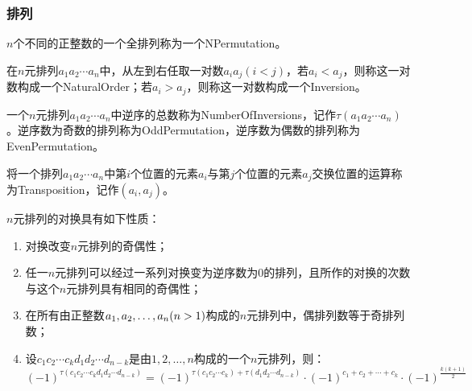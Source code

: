 \subsubsection{排列}
\begin{definition}
	$n$个不同的正整数的一个全排列称为一个\gls{NPermutation}。
\end{definition}
\begin{definition}
	在$n$元排列$a_1a_2\cdots a_n$中，从左到右任取一对数$a_ia_j(i<j)$，若$a_i<a_j$，则称这一对数构成一个\gls{NaturalOrder}；若$a_i>a_j$，则称这一对数构成一个\gls{Inversion}。
\end{definition}
\begin{definition}
	一个$n$元排列$a_1a_2\cdots a_n$中逆序的总数称为\gls{NumberOfInversions}，记作$\tau(a_1a_2\cdots a_n)$。逆序数为奇数的排列称为\gls{OddPermutation}，逆序数为偶数的排列称为\gls{EvenPermutation}。
\end{definition}
\begin{definition}
	将一个排列$a_1a_2\cdots a_n$中第$i$个位置的元素$a_i$与第$j$个位置的元素$a_j$交换位置的运算称为\gls{Transposition}，记作$(a_i,a_j)$。
\end{definition}
\begin{property}\label{prop:Transposition}
	$n$元排列的对换具有如下性质：
	\begin{enumerate}
		\item 对换改变$n$元排列的奇偶性；
		\item 任一$n$元排列可以经过一系列对换变为逆序数为$0$的排列，且所作的对换的次数与这个$n$元排列具有相同的奇偶性；
		\item 在所有由正整数$a_1, a_2, \dots, a_{n}(n>1)$构成的$n$元排列中，偶排列数等于奇排列数；
		\item 设$c_1c_2\cdots c_kd_1d_2\cdots d_{n-k}$是由$1,2,\dots,n$构成的一个$n$元排列，则：
		\begin{equation*}
			(-1)^{\tau(c_1c_2\cdots c_kd_1d_2\cdots d_{n-k})}=(-1)^{\tau(c_1c_2\cdots c_k)+\tau(d_1d_2\cdots d_{n-k})}\cdot(-1)^{c_1+c_2+\cdots+c_k}\cdot(-1)^{\frac{k(k+1)}{2}}
		\end{equation*}
	\end{enumerate}
\end{property}
